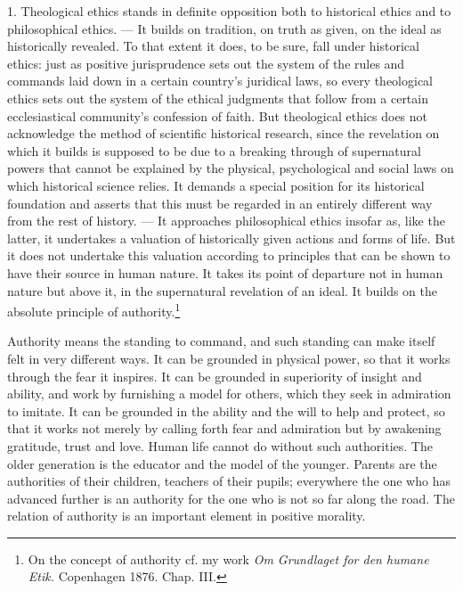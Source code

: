 \documentclass[12pt,a4paper,openany]{book}
\newcommand{\opage}[1]{\marginnote{\footnotesize\textit{[#1]}}}
\begin{document}
1. Theological ethics stands in definite opposition both to historical ethics and to philosophical
ethics. --- It builds on tradition, on truth as given, on the ideal
\opage{14}as historically revealed. To that extent it does, to be sure, fall under historical ethics: just
as positive jurisprudence sets out the system of the rules and commands laid down in a certain
country's juridical laws, so every theological ethics sets out the system of the ethical judgments
that follow from a certain ecclesiastical community's confession of faith. But theological ethics
does not acknowledge the method of scientific historical research, since the revelation on which it
builds is supposed to be due to a breaking through of supernatural powers that cannot be explained
by the physical, psychological and social laws on which historical science relies. It demands a
special position for its historical foundation and asserts that this must be regarded in an
entirely different way from the rest of history. --- It approaches philosophical ethics insofar as,
like the latter, it undertakes a valuation of historically given actions and forms of life. But it
does not undertake this valuation according to principles that can be shown to have their source in
human nature. It takes its point of departure not in human nature but above it, in the supernatural
revelation of an ideal. It builds on the absolute principle of
authority.\footnote[1]{On the concept of authority cf. my work \textit{Om Grundlaget for den humane
Etik.} Copenhagen 1876. Chap. III.}

Authority means the standing to command, and such standing can make itself felt in very different
ways. It can be grounded in physical power, so that it works through the fear it inspires. It can be
grounded in superiority of insight and ability, and work by furnishing a model for others, which
they seek in admiration to imitate. It can be grounded in the ability and the will to help and
protect, so that it works not merely by calling forth fear and admiration but by awakening
gratitude, trust and love. Human life cannot do without such authorities. The older generation is
the educator and the model of the younger. Parents are the authorities of their children, teachers
of their pupils; everywhere the one who has advanced further is an authority for the one who is not
so far along the road. The relation of authority is an important element in positive morality.
\end{document}
